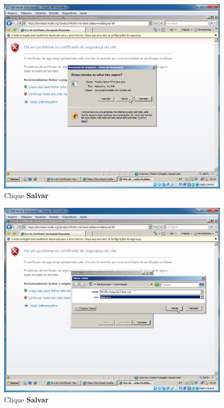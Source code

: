 \documentclass[10pt]{article}
\begin{document}
\begin{figure}[H]
    \centering
    \caption{Clique \textbf{Salvar}}
    \label{fig:re061}
    \includegraphics[width=\linewidth]{images/rede_externa/re061.png}
\end{figure}
\begin{figure}[H]
    \centering
    \caption{Clique \textbf{Salvar}}
    \label{fig:re062}
    \includegraphics[width=\linewidth]{images/rede_externa/re062.png}
\end{figure}
\end{document}
